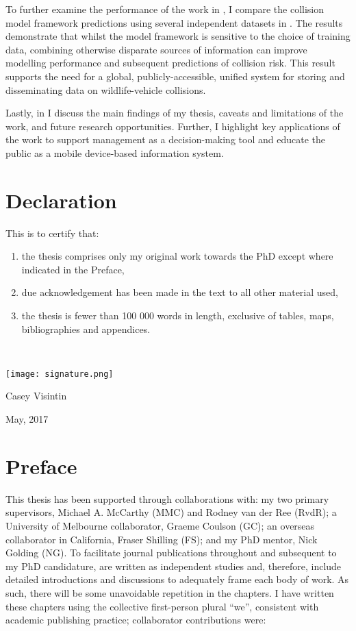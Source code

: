 \documentclass[titlesmallcaps,copyrightpage,examinerscopy]{uomthesis}
\begin{document}
To further examine the performance of the work in , I compare the collision model framework predictions using several independent datasets in . The results demonstrate that whilst the model framework is sensitive to the choice of training data, combining otherwise disparate sources of information can improve modelling performance and subsequent predictions of collision risk. This result supports the need for a global, publicly-accessible, unified system for storing and disseminating data on wildlife-vehicle collisions.

Lastly, in  I discuss the main findings of my thesis, caveats and limitations of the work, and future research opportunities. Further, I highlight key applications of the work to support management as a decision-making tool and educate the public as a mobile device-based information system.
\clearpage{\pagestyle{empty}\cleardoublepage}

\chapter{Declaration}
This is to certify that:
{\renewcommand{\theenumi}{\roman{enumi}}%
\begin{enumerate}
 \item the thesis comprises only my original work towards the PhD except where indicated in the Preface,
 \item due acknowledgement has been made in the text to all other material used,
 \item the thesis is fewer than 100 000 words in length, exclusive of tables, maps, bibliographies and appendices.
\end{enumerate}
}
\hrulefill \\

\begin{flushright} 
\texttt{[image: signature.png]}

Casey Visintin

May, 2017
\end{flushright}
\clearpage{\pagestyle{empty}\cleardoublepage}

\chapter{Preface}
This thesis has been supported through collaborations with: my two primary supervisors, Michael A. McCarthy (MMC) and Rodney van der Ree (RvdR); a University of Melbourne collaborator, Graeme Coulson (GC); an overseas collaborator in California, Fraser Shilling (FS); and my PhD mentor, Nick Golding (NG). To facilitate journal publications throughout and subsequent to my PhD candidature,  are written as independent studies and, therefore, include detailed introductions and discussions to adequately frame each body of work. As such, there will be some unavoidable repetition in the chapters. I have written these chapters using the collective first-person plural ``we'', consistent with academic publishing practice; collaborator contributions were:
\end{document}
